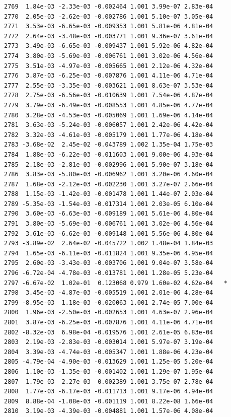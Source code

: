 \documentclass[
  letterpaper,
  DIV=11,
  numbers=noendperiod]{scrartcl}
\begin{document}
\begin{verbatim}
2769  1.84e-03 -2.33e-03 -0.002464 1.001 3.99e-07 2.83e-04    
2770  2.05e-03 -2.62e-03 -0.002786 1.001 5.10e-07 3.05e-04    
2771  3.53e-03 -6.65e-03 -0.009353 1.001 5.81e-06 4.81e-04    
2772  2.64e-03 -3.48e-03 -0.003771 1.001 9.36e-07 3.61e-04    
2773  3.49e-03 -6.65e-03 -0.009437 1.001 5.92e-06 4.82e-04    
2774  3.80e-03 -5.69e-03 -0.006761 1.001 3.02e-06 4.56e-04    
2775  3.51e-03 -4.97e-03 -0.005665 1.001 2.12e-06 4.32e-04    
2776  3.87e-03 -6.25e-03 -0.007876 1.001 4.11e-06 4.71e-04    
2777  2.55e-03 -3.35e-03 -0.003621 1.001 8.63e-07 3.53e-04    
2778  2.75e-03 -6.56e-03 -0.010639 1.001 7.54e-06 4.87e-04    
2779  3.79e-03 -6.49e-03 -0.008553 1.001 4.85e-06 4.77e-04    
2780  3.28e-03 -4.53e-03 -0.005069 1.001 1.69e-06 4.14e-04    
2781  3.63e-03 -5.24e-03 -0.006057 1.001 2.42e-06 4.42e-04    
2782  3.32e-03 -4.61e-03 -0.005179 1.001 1.77e-06 4.18e-04    
2783 -3.68e-02  2.45e-02 -0.043789 1.002 1.35e-04 1.75e-03    
2784  1.88e-03 -6.22e-03 -0.011603 1.001 9.00e-06 4.93e-04    
2785  2.18e-03 -2.81e-03 -0.002996 1.001 5.90e-07 3.18e-04    
2786  3.83e-03 -5.80e-03 -0.006962 1.001 3.20e-06 4.60e-04    
2787  1.68e-03 -2.12e-03 -0.002230 1.001 3.27e-07 2.66e-04    
2788  1.15e-03 -1.42e-03 -0.001478 1.001 1.44e-07 2.03e-04    
2789 -5.35e-03 -1.54e-03 -0.017314 1.001 2.03e-05 6.10e-04    
2790  3.60e-03 -6.63e-03 -0.009189 1.001 5.61e-06 4.80e-04    
2791  3.80e-03 -5.69e-03 -0.006761 1.001 3.02e-06 4.56e-04    
2792  3.61e-03 -6.62e-03 -0.009148 1.001 5.56e-06 4.80e-04    
2793 -3.89e-02  2.64e-02 -0.045722 1.002 1.48e-04 1.84e-03    
2794  1.65e-03 -6.11e-03 -0.011824 1.001 9.35e-06 4.95e-04    
2795  2.60e-03 -3.43e-03 -0.003706 1.001 9.04e-07 3.58e-04    
2796 -6.72e-04 -4.78e-03 -0.013781 1.001 1.28e-05 5.23e-04    
2797 -6.67e-02  1.02e-01  0.123068 0.979 1.60e-02 4.62e-04   *
2798  3.45e-03 -4.87e-03 -0.005519 1.001 2.01e-06 4.28e-04    
2799 -8.95e-03  1.18e-03 -0.020063 1.001 2.74e-05 7.00e-04    
2800  1.96e-03 -2.50e-03 -0.002653 1.001 4.63e-07 2.96e-04    
2801  3.87e-03 -6.25e-03 -0.007876 1.001 4.11e-06 4.71e-04    
2802 -8.32e-03  6.98e-04 -0.019576 1.001 2.61e-05 6.83e-04    
2803  2.19e-03 -2.83e-03 -0.003014 1.001 5.97e-07 3.19e-04    
2804  3.39e-03 -4.74e-03 -0.005347 1.001 1.88e-06 4.23e-04    
2805 -4.79e-04 -4.90e-03 -0.013629 1.001 1.25e-05 5.20e-04    
2806  1.10e-03 -1.35e-03 -0.001402 1.001 1.29e-07 1.95e-04    
2807  1.79e-03 -2.27e-03 -0.002389 1.001 3.75e-07 2.78e-04    
2808  1.77e-03 -6.17e-03 -0.011713 1.001 9.17e-06 4.94e-04    
2809  8.88e-04 -1.08e-03 -0.001119 1.001 8.22e-08 1.66e-04    
2810  3.19e-03 -4.39e-03 -0.004881 1.001 1.57e-06 4.08e-04    

\end{verbatim}
\end{document}
